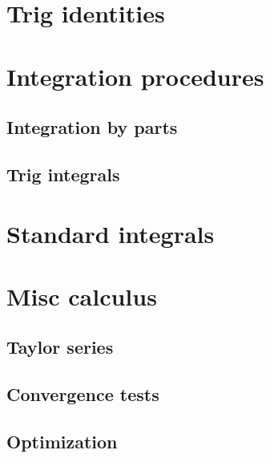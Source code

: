\documentclass[nobib,notoc]{tufte-handout}
\begin{document}
\section{Trig identities}

\section{Integration procedures}
\subsection{Integration by parts}
\subsection{Trig integrals}

\section{Standard integrals}

\section{Misc calculus}
\subsection{Taylor series}
\subsection{Convergence tests}
\subsection{Optimization}
\begin{defi}
\end{defi}
\end{document}
